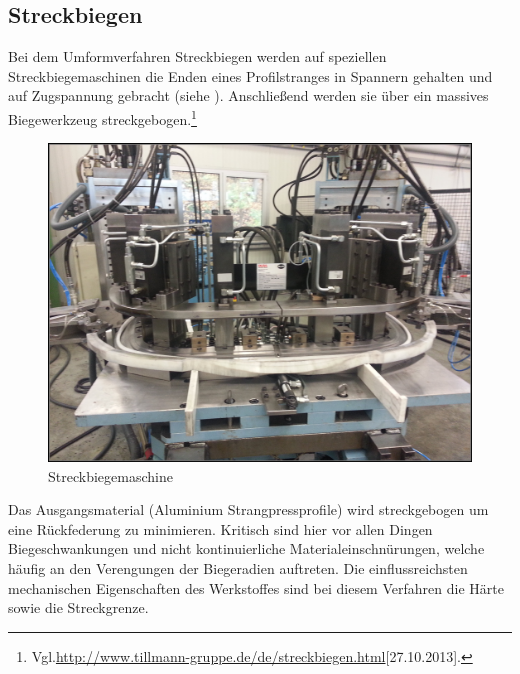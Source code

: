 \documentclass[12pt,a4paper,parskip]{scrartcl}
\begin{document}
{\subsection{Streckbiegen}
Bei dem Umformverfahren Streckbiegen werden auf speziellen Streckbiegemaschinen die Enden eines Profilstranges in Spannern gehalten und auf  Zugspannung gebracht (siehe  ). Anschließend werden sie über ein massives Biegewerkzeug streckgebogen.\footnote{Vgl.\url{http://www.tillmann-gruppe.de/de/streckbiegen.html}[27.10.2013].}
\begin{figure}[!htb]
\centering
\includegraphics[width=.5\linewidth,height=.2\textheight]{Streckbiegemaschine}
\caption{Streckbiegemaschine}
\label{fig:Streckbiegemaschine}
\end{figure}
Das Ausgangsmaterial (Aluminium Strangpressprofile) wird streckgebogen um eine Rückfederung zu minimieren. Kritisch sind hier vor allen Dingen Biegeschwankungen und nicht kontinuierliche Materialeinschnürungen,  welche häufig an den Verengungen der Biegeradien auftreten. Die einflussreichsten mechanischen Eigenschaften des Werkstoffes sind bei diesem Verfahren die Härte sowie die Streckgrenze.

}
\end{document}
